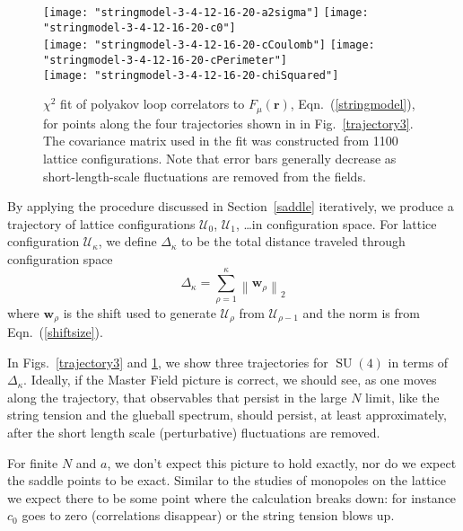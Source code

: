 \documentclass[preprint,aps,prd]{revtex4-2}
\newcommand{\be}{\begin{equation}}
\newcommand{\eq}{\end{equation}}
\newcommand{\config}{\mathcal{U}}
\DeclareMathOperator{\SU}{SU}
\begin{document}
\begin{figure}[p]
\texttt{[image: "stringmodel-3-4-12-16-20-a2sigma"]}\hfill
\texttt{[image: "stringmodel-3-4-12-16-20-c0"]}\\
\vspace{3ex}
\texttt{[image: "stringmodel-3-4-12-16-20-cCoulomb"]}\hfill
\texttt{[image: "stringmodel-3-4-12-16-20-cPerimeter"]}\\
\vspace{3ex}
\texttt{[image: "stringmodel-3-4-12-16-20-chiSquared"]}
\caption{$\chi^2$ fit of polyakov loop correlators to $F_\mu(\mathbf{r})$,
  Eqn.~(\ref{stringmodel}),
  for points along the four trajectories
  shown in in Fig.~\ref{trajectory3}.
  The covariance matrix used in the fit was
  constructed from 1100 lattice configurations.
  Note that error bars generally decrease as short-length-scale
  fluctuations are removed from the fields.  \label{traj4b}
 }
\end{figure}

\afterpage{\clearpage}

By applying the procedure discussed in Section~\ref{saddle} iteratively,
we produce a trajectory of lattice configurations $\config_0$,
$\config_1$, \ldots in configuration space.  For lattice configuration
$\config_\kappa$, we define
$\Delta_\kappa$ to be the total distance traveled through configuration
space
\be
\Delta_\kappa = \sum_{\rho=1}^\kappa \left\lVert \mathbf{w}_\rho\right\rVert_2
\eq
where $\mathbf{w}_\rho$ is the shift used to generate $\config_\rho$
from $\config_{\rho-1}$ and the norm is from Eqn.~(\ref{shiftsize}).


In Figs.~\ref{trajectory3} and \ref{traj4b}, we show three
trajectories for $\SU(4)$ in terms of $\Delta_\kappa$.  Ideally,
if the Master Field picture is correct, we should see, as
one moves along the trajectory, that observables that persist
in the large $N$ limit, like the string tension and the
glueball spectrum, should persist, at least approximately,
after the short length scale (perturbative) fluctuations are removed.

For finite $N$ and $a$, we don't expect this picture to
hold exactly, nor do we expect the saddle points to be
exact. Similar to the studies of monopoles on the lattice
we expect there to be some point where the calculation breaks
down:  for instance $c_0$ goes to zero (correlations disappear)
or the string tension blows up.
\end{document}
